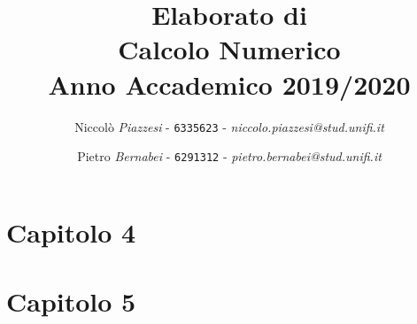 \documentclass[a4paper]{article}
\date{}
\begin{document}
\title{\vspace{2cm}Elaborato di\\ \textbf{Calcolo Numerico}\\ Anno Accademico 2019/2020\vspace{3cm}}

\author{Niccolò \emph{Piazzesi} - \texttt{6335623} - \textit{niccolo.piazzesi@stud.unifi.it}
   \and Pietro \emph{Bernabei} - \texttt{6291312} - \textit{pietro.bernabei@stud.unifi.it}}


\maketitle
\newpage
\tableofcontents
\newpage
\listoffigures
\listoftables


\newpage






\newpage
\section{\textbf{Capitolo 4}}


\newpage
\section{\textbf{Capitolo 5}}

\newpage
{}
\end{document}
